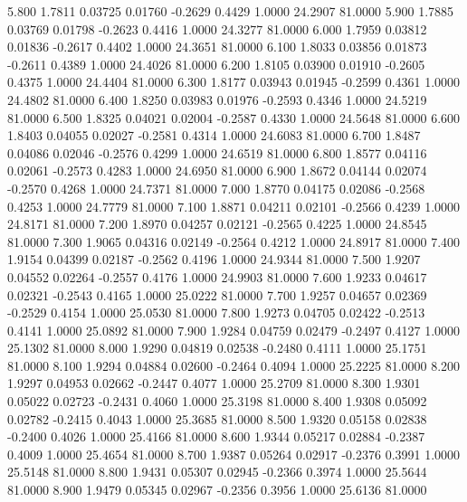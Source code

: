    5.800   1.7811   0.03725   0.01760  -0.2629   0.4429   1.0000  24.2907  81.0000
   5.900   1.7885   0.03769   0.01798  -0.2623   0.4416   1.0000  24.3277  81.0000
   6.000   1.7959   0.03812   0.01836  -0.2617   0.4402   1.0000  24.3651  81.0000
   6.100   1.8033   0.03856   0.01873  -0.2611   0.4389   1.0000  24.4026  81.0000
   6.200   1.8105   0.03900   0.01910  -0.2605   0.4375   1.0000  24.4404  81.0000
   6.300   1.8177   0.03943   0.01945  -0.2599   0.4361   1.0000  24.4802  81.0000
   6.400   1.8250   0.03983   0.01976  -0.2593   0.4346   1.0000  24.5219  81.0000
   6.500   1.8325   0.04021   0.02004  -0.2587   0.4330   1.0000  24.5648  81.0000
   6.600   1.8403   0.04055   0.02027  -0.2581   0.4314   1.0000  24.6083  81.0000
   6.700   1.8487   0.04086   0.02046  -0.2576   0.4299   1.0000  24.6519  81.0000
   6.800   1.8577   0.04116   0.02061  -0.2573   0.4283   1.0000  24.6950  81.0000
   6.900   1.8672   0.04144   0.02074  -0.2570   0.4268   1.0000  24.7371  81.0000
   7.000   1.8770   0.04175   0.02086  -0.2568   0.4253   1.0000  24.7779  81.0000
   7.100   1.8871   0.04211   0.02101  -0.2566   0.4239   1.0000  24.8171  81.0000
   7.200   1.8970   0.04257   0.02121  -0.2565   0.4225   1.0000  24.8545  81.0000
   7.300   1.9065   0.04316   0.02149  -0.2564   0.4212   1.0000  24.8917  81.0000
   7.400   1.9154   0.04399   0.02187  -0.2562   0.4196   1.0000  24.9344  81.0000
   7.500   1.9207   0.04552   0.02264  -0.2557   0.4176   1.0000  24.9903  81.0000
   7.600   1.9233   0.04617   0.02321  -0.2543   0.4165   1.0000  25.0222  81.0000
   7.700   1.9257   0.04657   0.02369  -0.2529   0.4154   1.0000  25.0530  81.0000
   7.800   1.9273   0.04705   0.02422  -0.2513   0.4141   1.0000  25.0892  81.0000
   7.900   1.9284   0.04759   0.02479  -0.2497   0.4127   1.0000  25.1302  81.0000
   8.000   1.9290   0.04819   0.02538  -0.2480   0.4111   1.0000  25.1751  81.0000
   8.100   1.9294   0.04884   0.02600  -0.2464   0.4094   1.0000  25.2225  81.0000
   8.200   1.9297   0.04953   0.02662  -0.2447   0.4077   1.0000  25.2709  81.0000
   8.300   1.9301   0.05022   0.02723  -0.2431   0.4060   1.0000  25.3198  81.0000
   8.400   1.9308   0.05092   0.02782  -0.2415   0.4043   1.0000  25.3685  81.0000
   8.500   1.9320   0.05158   0.02838  -0.2400   0.4026   1.0000  25.4166  81.0000
   8.600   1.9344   0.05217   0.02884  -0.2387   0.4009   1.0000  25.4654  81.0000
   8.700   1.9387   0.05264   0.02917  -0.2376   0.3991   1.0000  25.5148  81.0000
   8.800   1.9431   0.05307   0.02945  -0.2366   0.3974   1.0000  25.5644  81.0000
   8.900   1.9479   0.05345   0.02967  -0.2356   0.3956   1.0000  25.6136  81.0000

